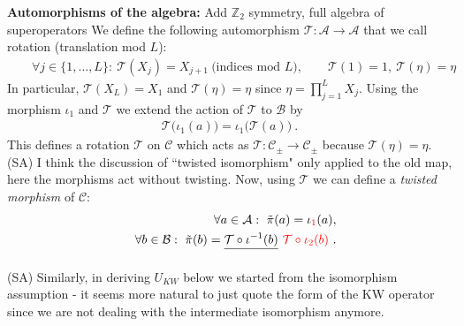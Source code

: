 \documentclass{article}
\newcommand{\mA}{\mathcal{A}}
\newcommand{\mB}{\mathcal{B}}
\newcommand{\mC}{\mathcal{C}}
\newcommand{\mT}{\mathcal{T}}
\theoremstyle{definition}
\newcommand{\SA}[1]{{\color{sulaiman}\footnotesize{(SA) #1}}}
\begin{document}
  {\bf Automorphisms of the algebra:}
  \color{brown}
  Add $\mathbb{Z}_{2}$ symmetry, full algebra of superoperators
  \color{black}
  We define the following automorphism $\mT:\mA\to \mA$ that we call rotation (translation
  mod $L$):
  \begin{eqnarray}
    &&\forall j\in\{1,\dots,L\}:\ \mT(X_j)=X_{j+1}\ \text{(indices mod $L$)},\qquad
    \mT(1)=1,\ \mT(\eta)=\eta
  \end{eqnarray}
  In particular, $\mT(X_{L})=X_{1}$ and $\mT(\eta)=\eta$ since
  $\eta=\prod_{j=1}^{L}X_{j}$. Using the morphism $\iota_{1}$ and $\mT$ we extend
  the action of $\mT$ to $\mB$ by
  \begin{eqnarray}
    \mT\bigl(\iota_1(a)\bigr)=\iota_1\bigl(\mT(a)\bigr)\ .
  \end{eqnarray}
  This defines a rotation $\mT$ on $\mC$ which acts as $\mT:\mC_{\pm}\to \mC_{\pm}$
  because $\mT(\eta)=\eta$. \SA{I think the discussion of ``twisted isomorphism" only applied to the old map, here the morphisms act without twisting.}
  Now, using $\mT$ we can define a {\it twisted morphism} of $\mC$:
  \begin{eqnarray}
    \label{twisterrepresC} &&\forall a\in \mA:\ \tilde{\pi}(a)=\iota
    \color{red}
    _1
    \color{black}
    (a),\\
    &&\forall b\in \mB:\ \tilde{\pi}(b)=\sout{\mT\circ\iota^{-1}(b)}\
    \color{red}
    \mT\circ\iota_2(b)
    \color{black}
    \ .
  \end{eqnarray}

  \SA{Similarly, in deriving $U_{KW}$ below we started from the isomorphism assumption - it seems more natural to just quote the form of the KW operator since we are not dealing with the intermediate isomorphism anymore.}
\end{document}

